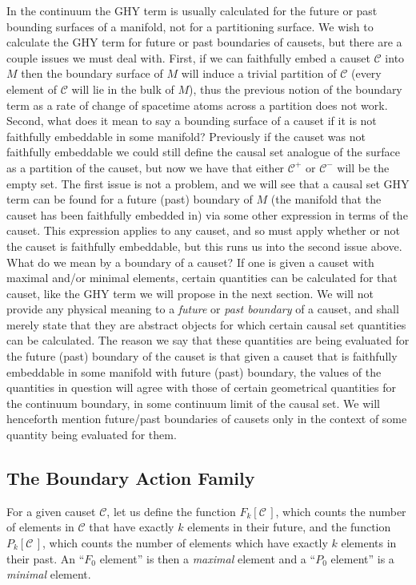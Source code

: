 \documentclass[12pt]{article}
\newcommand{\F}[1]{F_{#1}}
\renewcommand{\P}[1]{P_{#1}}
\begin{document}
In the continuum the GHY term is usually calculated for the future or past bounding surfaces of a manifold, not for a partitioning surface. We wish to calculate the GHY term for future or past boundaries of causets, but there are a couple issues we must deal with. First, if we can faithfully embed a causet $\mathcal{C}$ into $M$ then the boundary surface of $M$ will induce a trivial partition of $\mathcal{C}$ (every element of $\mathcal{C}$ will lie in the bulk of $M$), thus the previous notion of the boundary term as a rate of change of spacetime atoms across a partition does not work. Second, what does it mean to say a bounding surface of a causet if it is not faithfully embeddable in some manifold? Previously if the causet was not faithfully embeddable we could still define the causal set analogue of the surface as a partition of the causet, but now we have that either $\mathcal{C}^+$ or $\mathcal{C}^-$ will be the empty set. The first issue is not a problem, and we will see that a causal set GHY term can be found for a future (past) boundary of $M$ (the manifold that the causet has been faithfully embedded in) via some other expression in terms of the causet. This expression applies to any causet, and so must apply whether or not the causet is faithfully embeddable, but this runs us into the second issue above. What do we mean by a boundary of a causet? If one is given a causet with maximal and/or minimal elements, certain quantities can be calculated for that causet, like the GHY term we will propose in the next section. We will not provide any physical meaning to a \emph{future} or \emph{past boundary} of a causet, and shall merely state that they are abstract objects for which certain causal set quantities can be calculated. The reason we say that these quantities are being evaluated for the future (past) boundary of the causet is that given a causet that is faithfully embeddable in some manifold with future (past) boundary, the values of the quantities in question will agree with those of certain geometrical quantities for the continuum boundary, in some continuum limit of the causal set. We will henceforth mention future/past boundaries of causets only in the context of some quantity being evaluated for them.

\subsection{The Boundary Action Family}

For a given causet $\mathcal C$, let us define the function $\F{k}\left[\mathcal{C}\,\right]$, which counts the number of elements in $\mathcal C$ that have exactly $k$ elements in their future, and the function $\P{k}\left[\mathcal{C}\,\right]$, which counts the number of elements which have exactly $k$ elements in their past. An ``$F_0$ element'' is then a \emph{maximal} element and a ``$P_0$ element'' is a \emph{minimal} element.
\end{document}
